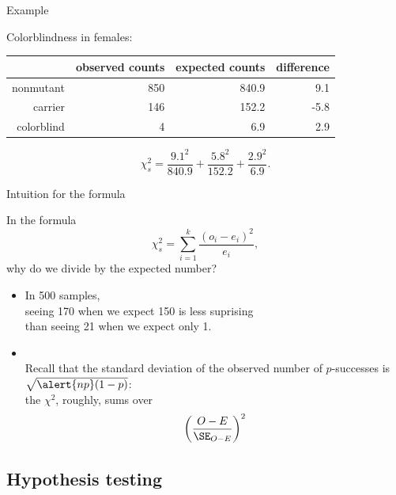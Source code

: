 \begin{frame}{Example}

    Colorblindness in females:
    \begin{center}
        \begin{tabular}{r|rrr}
            & observed counts & expected counts & difference\\
            \hline 
            nonmutant & 850 & 840.9 & 9.1 \\ 
            carrier &  146 & 152.2 & -5.8 \\ 
            colorblind & 4 & 6.9 & 2.9  \\
        \end{tabular}
    \end{center}

    \vspace{2em}

    \[
        \chi^2_s = \frac{9.1^2}{840.9} + \frac{5.8^2}{152.2} + \frac{2.9^2}{6.9} .
    \]

\end{frame}


\begin{frame}{Intuition for the formula}

    In the formula
        \[ \chi^2_s = \sum_{i=1}^k \frac{(o_i - e_i)^2}{e_i} , \]
    why do we divide by the expected number?

    \vspace{2em} \pause

    \begin{itemize}
        \item In 500 samples, \\
          seeing 170 when we expect 150 is \alert{less suprising} \\
            than seeing 21 when we expect only 1.
            \pause
        \item {} \\
          Recall that the standard deviation of the observed number of $p$-successes is $\sqrt{\alert{n p}(1-p) }$:\\
          the $\chi^2$, roughly, sums over 
          \[ \left( \frac{O-E}{\SE_{O-E}} \right)^2 \]

    \end{itemize}

\end{frame}

\subsection{Hypothesis testing}

